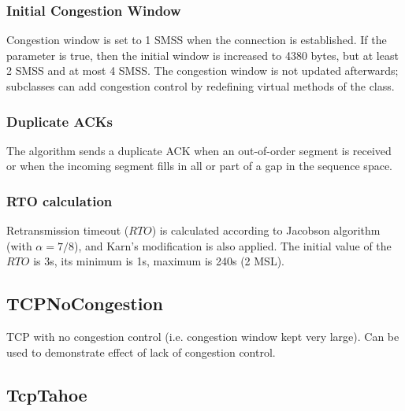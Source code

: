 \subsubsection*{Initial Congestion Window}

Congestion window is set to 1 SMSS when the connection is established.
If the  parameter is true, then the initial
window is increased to 4380 bytes, but at least 2 SMSS and at most 4 SMSS.
The congestion window is not updated afterwards; subclasses can
add congestion control by redefining virtual methods of the
 class.

\subsubsection*{Duplicate ACKs}

The algorithm sends a duplicate ACK when an out-of-order
segment is received or when the incoming segment fills in all
or part of a gap in the sequence space.

\subsubsection*{RTO calculation}

Retransmission timeout ($RTO$) is calculated according to
Jacobson algorithm (with $\alpha=7/8$), and Karn's modification is also applied.
The initial value of the $RTO$ is 3s, its minimum is 1s,
maximum is 240s (2 MSL).


\subsection{TCPNoCongestion}

TCP with no congestion control (i.e. congestion window kept very large).
Can be used to demonstrate effect of lack of congestion control.


\subsection{TcpTahoe}

